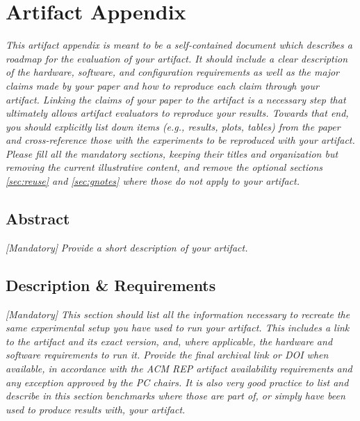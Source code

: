 %

\appendix
\section{Artifact Appendix} 
\textit{This artifact appendix is meant to be a self-contained document which describes a roadmap for the evaluation of your artifact. It should include a clear description of the hardware, software, and configuration requirements as well as the major claims made by your paper and how to reproduce each claim through your artifact. Linking the claims of your paper to the artifact is a necessary step that ultimately allows artifact evaluators to reproduce your results. Towards that end, you should explicitly list down items (e.g., results, plots, tables) from the paper and cross-reference those with the experiments to be reproduced with your artifact.}\\
\textit{Please fill all the mandatory sections, keeping their titles and organization but removing the current illustrative content, and remove the optional sections \ref{sec:reuse} and \ref{sec:gnotes} where those do not apply to your artifact.}


\subsection{Abstract}
{\em [Mandatory]} 
{\em Provide a short description of your artifact.}

\subsection{Description \& Requirements}

\textit{[Mandatory] This section should list all the information necessary to recreate the same experimental setup you have used to run your artifact. This includes a link to the artifact and its exact version, and, where applicable, the hardware and software requirements to run it. Provide the final archival link or DOI when available, in accordance with the ACM REP artifact availability requirements and any exception approved by the PC chairs. It is also very good practice to list and describe in this section benchmarks where those are part of, or simply have been used to produce results with, your artifact.}

